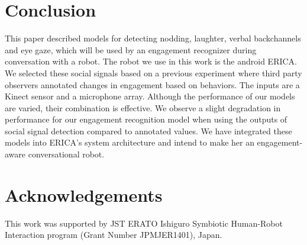 \documentclass[letterpaper]{article} %
\begin{document}
\vspace{-1.80mm}
\section{Conclusion}
This paper described models for detecting nodding, laughter, verbal backchannels and eye gaze, which will be used by an engagement recognizer during conversation with a robot. The robot we use in this work is the android ERICA. We selected these social signals based on a previous experiment where third party observers annotated changes in engagement based on behaviors. The inputs are a Kinect sensor and a microphone array. Although the performance of our models are varied, their combination is effective. We observe a slight degradation in performance for our engagement recognition model when using the outputs of social signal detection compared to annotated values. We have integrated these models into ERICA's system architecture and intend to make her an engagement-aware conversational robot.

\section{Acknowledgements}
This work was supported by JST ERATO Ishiguro Symbiotic Human-Robot Interaction program (Grant Number JPMJER1401), Japan.
\end{document}
